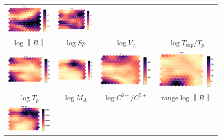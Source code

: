 \documentclass[utf8]{frontiersSCNS} %
\begin{document}
\begin{figure}[h!]
\begin{tabular}{CCCC}
		\includegraphics[width=4cm]{Amaya/comp-map-sigmac} &
		\includegraphics[width=4cm]{Amaya/comp-map-sigmar}\hfill
		\\
		$\log \left\lVert B \right\rVert $ & $\log Sp$ & $\log V_{A}$ & $\log T_{\text{exp}}/T_p$ \\
		\includegraphics[width=4cm]{Amaya/comp-map-log_Bmag} &
		\includegraphics[width=4cm]{Amaya/comp-map-log_Sp} &
		\includegraphics[width=4cm]{Amaya/comp-map-log_Va} &
		\includegraphics[width=4cm]{Amaya/comp-map-log_Tratio}\hfill
		\\
		$\log T_p$ & $\log M_A$ & $\log C^{6+}/C^{5+}$ & $\text{range} \log \left\lVert B \right\rVert $ \\
		\includegraphics[width=4cm]{Amaya/comp-map-log_proton_temp} &

\end{tabular}
\end{figure}
\end{document}
